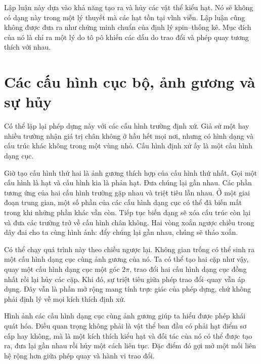 Lập luận này dựa vào khả năng tạo ra và hủy các vật thể kiểu hạt. Nó sẽ không có dạng này trong một lý thuyết mà các hạt tồn tại vĩnh viễn. Lập luận cũng không được đưa ra như chứng minh chuẩn của định lý spin--thống kê. Mục đích của nó là chỉ ra một lý do tô pô khiến các dấu do trao đổi và phép quay tương thích với nhau.

\section{Các cấu hình cục bộ, ảnh gương và sự hủy}

Có thể lặp lại phép dựng này với các cấu hình trường định xứ. Giả sử một hay nhiều trường nhận giá trị chân không ở hầu hết mọi nơi, nhưng có hình dạng và cấu trúc khác không trong một vùng nhỏ. Cấu hình định xứ ấy là một cấu hình dạng cục.

Giờ tạo cấu hình thứ hai là ảnh gương thích hợp của cấu hình thứ nhất. Gọi một cấu hình là hạt và cấu hình kia là phản hạt. Đưa chúng lại gần nhau. Các phần tương ứng của hai cấu hình trường gặp nhau và triệt tiêu lẫn nhau. Ở một giai đoạn trung gian, một số phần của các cấu hình dạng cục có thể đã biến mất trong khi những phần khác vẫn còn. Tiếp tục biến dạng sẽ xóa cấu trúc còn lại và đưa các trường trở về cấu hình chân không. Hai vòng xoắn ngược chiều trong dây đai cho ta cùng hình ảnh: đẩy chúng lại gần nhau, chúng sẽ tháo xoắn.

Có thể chạy quá trình này theo chiều ngược lại. Không gian trống có thể sinh ra một cấu hình dạng cục cùng ảnh gương của nó. Ta có thể tạo hai cặp như vậy, quay một cấu hình dạng cục một góc \(2\pi\), trao đổi hai cấu hình dạng cục đồng nhất rồi lại hủy các cặp. Khi đó, sự triệt tiêu giữa phép trao đổi--quay vẫn áp dụng. Đây vẫn là phần mở rộng mang tính trực giác của phép dựng, chứ không phải định lý về mọi kích thích định xứ.

\begin{classroomqa}
\end{classroomqa}

Hình ảnh các cấu hình dạng cục cùng ảnh gương giúp ta hiểu được phép khái quát hóa. Điều quan trọng không phải là vật thể ban đầu có phải hạt điểm sơ cấp hay không, mà là một kích thích kiểu hạt và đối tác của nó có thể được tạo ra, đưa lại gần nhau rồi hủy một cách liên tục. Đặc điểm đó gợi mở một mối liên hệ rộng hơn giữa phép quay và hành vi trao đổi.

